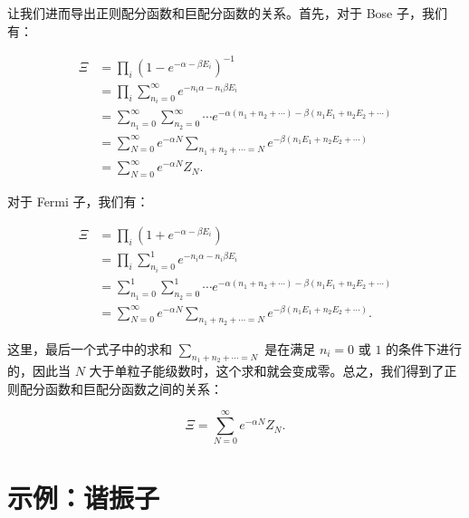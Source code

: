 让我们进而导出正则配分函数和巨配分函数的关系。首先，对于 Bose 子，我们有：
\begin{linenomath}\begin{equation}
    \begin{aligned}
            \Xi &= \prod_i \left( 1 - e^{-\alpha -\beta E_i } \right)^{-1} \\
            &= \prod_i \sum_{n_i=0}^\infty e^{-n_i\alpha - n_i\beta E_i} \\
            &= \sum_{n_1=0}^\infty \sum_{n_2=0}^\infty \cdots e^{-\alpha(n_1+n_2+\cdots) -\beta(n_1E_1 + n_2E_2 + \cdots)} \\
            &= \sum_{N=0}^\infty e^{-\alpha N} \sum_{n_1+n_2+\cdots = N} e^{-\beta(n_1E_1 + n_2E_2 + \cdots)} \\
            &= \sum_{N=0}^\infty e^{-\alpha N} Z_N.
    \end{aligned}
\end{equation}\end{linenomath}
对于 Fermi 子，我们有：
\begin{linenomath}\begin{equation}
    \begin{aligned}
            \Xi &= \prod_i \left( 1 + e^{-\alpha -\beta E_i } \right) \\
            &= \prod_i \sum_{n_i=0}^1 e^{-n_i\alpha - n_i\beta E_i} \\
            &= \sum_{n_1=0}^1 \sum_{n_2=0}^1 \cdots e^{-\alpha(n_1+n_2+\cdots) -\beta(n_1E_1 + n_2E_2 + \cdots)} \\
            &= \sum_{N=0}^\infty e^{-\alpha N} \sum_{n_1+n_2+\cdots = N} e^{-\beta(n_1E_1 + n_2E_2 + \cdots)} .
    \end{aligned}
\end{equation}\end{linenomath}
这里，最后一个式子中的求和 $\sum_{n_1+n_2+\cdots = N}$ 是在满足 $n_i=0$ 或 $1$ 的条件下进行的，因此当 $N$ 大于单粒子能级数时，这个求和就会变成零。总之，我们得到了正则配分函数和巨配分函数之间的关系：
\begin{linenomath}\begin{equation}
    \boxed{\Xi = \sum_{N=0}^\infty e^{-\alpha N} Z_N}.
\end{equation}\end{linenomath}
\section{示例：谐振子}
